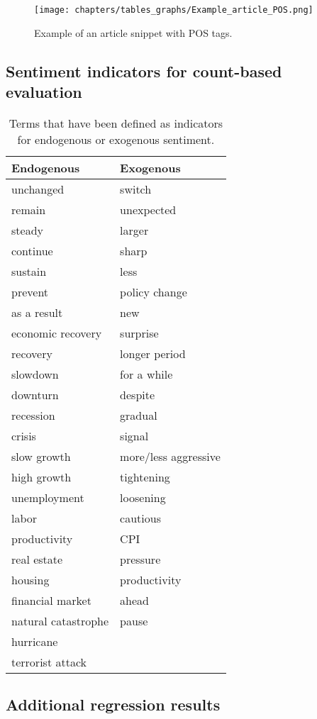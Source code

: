%
%
\begin{figure}[!h]
	\centering
	\texttt{[image: chapters/tables\_graphs/Example\_article\_POS.png]} 
	\caption{Example of an article snippet with POS tags.}
	\label{fig:POStaggedArticle}
\end{figure}
%

\newpage
\subsection{Sentiment indicators for count-based evaluation}
%
\begin{table}[!h]
	\tiny
	\caption{Terms that have been defined as indicators for endogenous or exogenous sentiment.}
	\label{tab:sentiment_words}
	\centering
	\begin{tabular}{ll}
		\toprule
		Endogenous & Exogenous \\
		\midrule
		unchanged &	switch\\
		remain	&	unexpected\\
		steady	&	larger\\
		continue	&	sharp\\
		sustain	&	less\\
		prevent	&	policy change\\
		as a result	&	new\\
		economic recovery	&	surprise\\
		recovery	&	longer period\\
		slowdown	&	for a while\\
		downturn	&	despite\\
		recession	&	gradual\\
		crisis	&	signal\\
		slow growth	&	more/less aggressive\\
		high growth	&	tightening\\
		unemployment	&	loosening\\
		labor	&	cautious\\
		productivity	&	CPI\\
		real estate	&	pressure\\
		housing	&	productivity\\
		financial market	&	ahead\\
		natural catastrophe	&	pause\\
		hurricane	&	\\
		terrorist attack	&	\\	
		\bottomrule
	\end{tabular}
\end{table}
%

\newpage
\subsection{Additional regression results}
%


%


%
